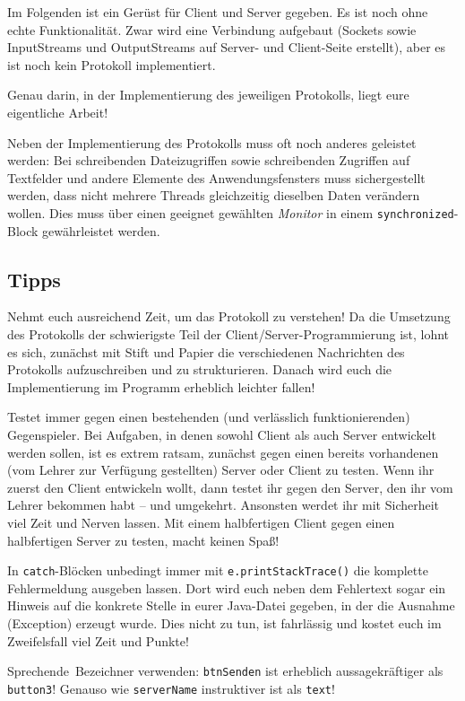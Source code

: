Im Folgenden ist ein Gerüst für Client und Server gegeben. Es ist noch ohne
echte Funktionalität. Zwar wird eine Verbindung aufgebaut (Sockets sowie
InputStreams und OutputStreams auf Server- und Client-Seite erstellt), aber es
ist noch kein Protokoll implementiert.

Genau darin, in der Implementierung des jeweiligen Protokolls, liegt eure
eigentliche Arbeit!

Neben der Implementierung des Protokolls muss oft noch anderes geleistet
werden: Bei schreibenden Dateizugriffen sowie schreibenden Zugriffen auf
Textfelder und andere Elemente des Anwendungsfensters muss sichergestellt
werden, dass nicht mehrere Threads gleichzeitig dieselben Daten verändern
wollen. Dies muss über einen geeignet gewählten \emph{Monitor} in einem
\lstinline|synchronized|-Block gewährleistet werden.

\subsection{Tipps}

\begin{compactitem}
\item Nehmt euch ausreichend Zeit, um das Protokoll zu verstehen! Da die
Umsetzung des Protokolls der schwierigste Teil der Client/Server-Programmierung
ist, lohnt es sich, zunächst mit Stift und Papier die verschiedenen Nachrichten
des Protokolls aufzuschreiben und zu strukturieren. Danach wird euch die
Implementierung im Programm erheblich leichter fallen!

\item Testet immer gegen einen bestehenden (und verlässlich funktionierenden)
\glqq Gegenspieler\grqq . Bei Aufgaben, in denen sowohl Client als auch Server
entwickelt werden sollen, ist es extrem ratsam, zunächst gegen einen bereits
vorhandenen (vom Lehrer zur Verfügung gestellten) Server oder Client zu testen.
Wenn ihr zuerst den Client entwickeln wollt, dann testet ihr gegen den Server,
den ihr vom Lehrer bekommen habt -- und umgekehrt. Ansonsten werdet ihr mit
Sicherheit viel Zeit und Nerven lassen. Mit einem halbfertigen Client gegen
einen halbfertigen Server zu testen, macht keinen Spaß!

\item In \lstinline|catch|-Blöcken unbedingt immer mit
\lstinline|e.printStackTrace()| die komplette Fehlermeldung ausgeben lassen.
Dort wird euch neben dem Fehlertext sogar ein Hinweis auf die konkrete Stelle
in eurer Java-Datei gegeben, in der die Ausnahme (Exception) erzeugt wurde.
Dies nicht zu tun, ist fahrlässig und kostet euch im Zweifelsfall viel Zeit und
Punkte!

\item \glqq Sprechende\grqq\ Bezeichner verwenden: \lstinline|btnSenden| ist
erheblich aussagekräftiger als \lstinline|button3|! Genauso wie
\lstinline|serverName| instruktiver ist als \lstinline|text|!
\end{compactitem}

